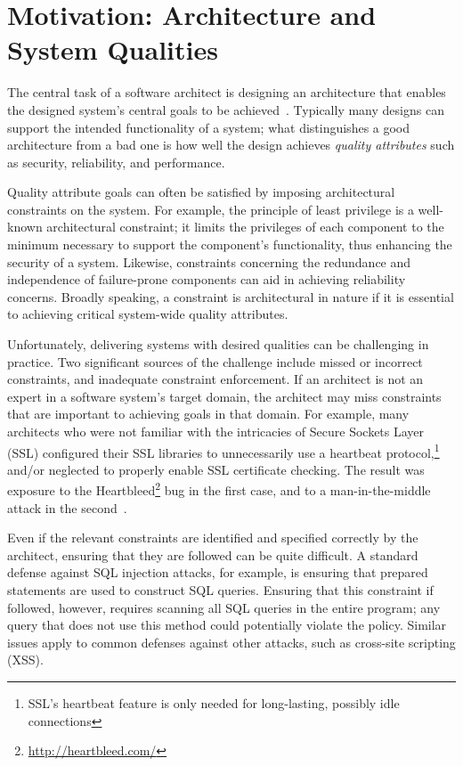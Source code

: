 \documentclass[runningheads]{llncs}
\begin{document}
\begin{sloppypar}
\section{Motivation: Architecture and System Qualities}
The central task of a software architect is designing an architecture that enables the designed system's central goals to be achieved~\cite{BCK03}.  Typically many designs can support the intended functionality of a system; what distinguishes a good architecture from a bad one is how well the design achieves \emph{quality attributes} such as security, reliability, and performance.

Quality attribute goals can often be satisfied by imposing architectural constraints on the system.  For example, the principle of least privilege is a well-known architectural constraint; it limits the privileges of each component to the minimum necessary to support the component's functionality, thus enhancing the security of a system.  Likewise, constraints concerning the redundance and independence of failure-prone components can aid in achieving reliability concerns.  Broadly speaking, a constraint is architectural in nature if it is essential to achieving critical system-wide quality attributes.

Unfortunately, delivering systems with desired qualities can be challenging in practice.  Two significant sources of the challenge include missed or incorrect constraints, and inadequate constraint enforcement.  If an architect is not an expert in a software system's target domain, the architect may miss constraints that are important to achieving goals in that domain.  For example, many architects who were not familiar with the intricacies of Secure Sockets Layer (SSL) configured their SSL libraries to unnecessarily use a heartbeat protocol,\footnote{SSL's heartbeat feature is only needed for long-lasting, possibly idle connections} and/or neglected to properly enable SSL certificate checking.  The result was exposure to the Heartbleed\footnote{\url{http://heartbleed.com/}} bug in the first case, and to a man-in-the-middle attack in the second~\cite{GIJABS12}.

Even if the relevant constraints are identified and specified correctly by the architect, ensuring that they are followed can be quite difficult.  A standard defense against SQL injection attacks, for example, is ensuring that prepared statements are used to construct SQL queries.  Ensuring that this constraint if followed, however, requires scanning all SQL queries in the entire program; any query that does not use this method could potentially violate the policy.  Similar issues apply to common defenses against other attacks, such as cross-site scripting (XSS).


\end{sloppypar}
\end{document}
